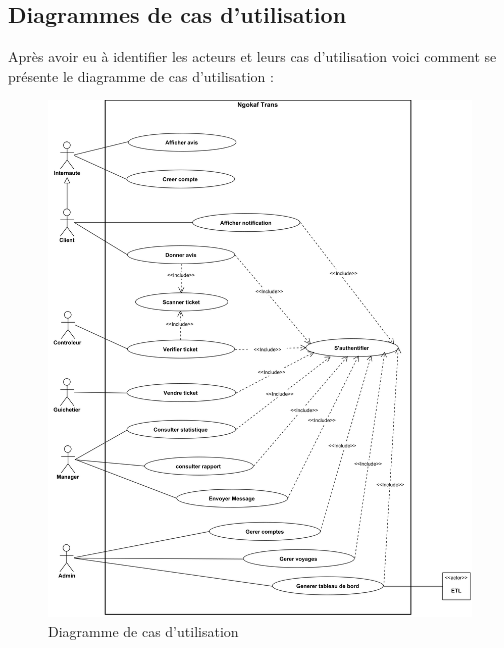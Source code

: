     \subsection[Diagrammes de cas d’utilisation]{Diagrammes de cas d’utilisation}
    Après avoir eu à identifier les acteurs et leurs cas d’utilisation
    voici comment se présente le diagramme de cas d’utilisation :
        \begin{figure}[H]
            \centering
            \includegraphics[width=150mm]{images/diagramme-de-cu/Systeme Future.png}
            \caption{Diagramme de cas d’utilisation}
            \label{fig:dcu}
        \end{figure}
\pagebreak